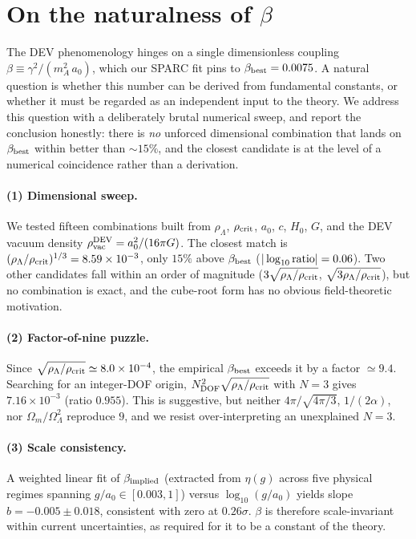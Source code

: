 \section{On the naturalness of $\beta$}
\label{sec:beta_origin}

The DEV phenomenology hinges on a single dimensionless coupling
$\beta \equiv \gamma^{2}/(m_{A}^{2}\,a_{0})$, which our SPARC fit pins to
$\beta_{\rm best} = 0.0075$. A natural question is whether this number can be
derived from fundamental constants, or whether it must be regarded as an
independent input to the theory. We address this question with a deliberately
brutal numerical sweep, and report the conclusion honestly: there is
\emph{no} unforced dimensional combination that lands on $\beta_{\rm best}$
within better than $\sim 15\%$, and the closest candidate is at the level of
a numerical coincidence rather than a derivation.

\paragraph{(1) Dimensional sweep.} We tested fifteen combinations built from
$\rho_{\Lambda}$, $\rho_{\rm crit}$, $a_{0}$, $c$, $H_{0}$, $G$, and the DEV
vacuum density $\rho_{\rm vac}^{\rm DEV} = a_{0}^{2}/(16\pi G)$. The closest
match is $(\rho_{\Lambda}/\rho_{\rm crit})^{1/3} = 8.59\times 10^{-3}$, only
$15\%$ above $\beta_{\rm best}$ ($|\log_{10}{\rm ratio}| = 0.06$). Two other
candidates fall within an order of magnitude
($3\sqrt{\rho_{\Lambda}/\rho_{\rm crit}}$, $\sqrt{3\rho_{\Lambda}/\rho_{\rm crit}}$),
but no combination is exact, and the cube-root form has no obvious
field-theoretic motivation.

\paragraph{(2) Factor-of-nine puzzle.} Since
$\sqrt{\rho_{\Lambda}/\rho_{\rm crit}} \simeq 8.0\times 10^{-4}$, the empirical
$\beta_{\rm best}$ exceeds it by a factor $\simeq 9.4$. Searching for an
integer-DOF origin, $N_{\rm DOF}^{2}\sqrt{\rho_{\Lambda}/\rho_{\rm crit}}$ with
$N=3$ gives $7.16\times 10^{-3}$ (ratio $0.955$). This is suggestive, but
neither $4\pi/\sqrt{4\pi/3}$, $1/(2\alpha)$, nor $\Omega_{m}/\Omega_{\Lambda}^{2}$
reproduce $9$, and we resist over-interpreting an unexplained $N=3$.

\paragraph{(3) Scale consistency.} A weighted linear fit of
$\beta_{\rm implied}$ (extracted from $\eta(g)$ across five physical regimes
spanning $g/a_{0}\in[0.003,1]$) versus $\log_{10}(g/a_{0})$ yields slope
$b = -0.005 \pm 0.018$, consistent with zero at $0.26\sigma$. $\beta$ is
therefore scale-invariant within current uncertainties, as required for it
to be a constant of the theory.

